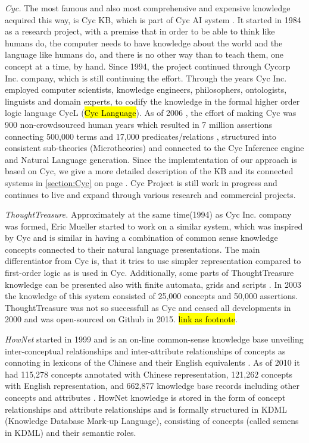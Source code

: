 \emph{Cyc.} The most famous and also most comprehensive and expensive knowledge acquired this way, is Cyc KB, which is part of Cyc AI system \parencite{Lenat1995}. It started in 1984 as a research project, with a premise that in order to be able to think like humans do, the computer needs to have knowledge about the world and the language like humans do, and there is no other way than to teach them, one concept at a time, by hand. Since 1994, the project continued through Cycorp Inc. company, which is still continuing the effort. Through the years Cyc Inc. employed computer scientists, knowledge engineers, philosophers, ontologists, linguists and domain experts, to codify the knowledge in the formal higher order logic language CycL (\hl{Cyc Language}). As of 2006   \parencite{Matuszek2006}, the effort of making Cyc was 900 non-crowdsourced human years which resulted in 7 million assertions connecting 500,000 terms and 17,000 predicates/relations \parencite{Zang2013}, structured into consistent sub-theories (Microtheories) and connected to the Cyc Inference engine and Natural Language generation. Since the implemtentation of our approach is based on Cyc, we give a more detailed description of the KB and its connected systems in \autoref{section:Cyc} on page \pageref{section:Cyc}. Cyc Project is still work in progress and continues to live and expand through various research and commercial projects.

\emph{ThoughtTreasure.} Approximately at the same time(1994) as Cyc Inc. company was formed, Eric Mueller started to work on a similar system, which was inspired by Cyc and is similar in having a combination of common sense knowledge concepts connected to their natural language presentations. The main differentiator from Cyc is, that it tries to use simpler representation compared to first-order logic as is used in Cyc. Additionally, some parts of ThoughtTreasure knowledge can be presented also with finite automata, grids and scripts \parencite{Mueller1999,Mueller2003}. In 2003 the knowledge of this system consisted of 25,000 concepts and 50,000 assertions. ThoughtTreasure was not so successfull as Cyc and ceased all developments in 2000 and was open-sourced on Github in 2015. \hl{link as footnote}.

\emph{HowNet} started in 1999 and is an on-line common-sense knowledge base unveiling inter-conceptual relationships and inter-attribute relationships of concepts as connoting in lexicons of the Chinese and their English equivalents . As of 2010 it had 115,278 concepts annotated with Chinese representation, 121,262 concepts with English representation, and 662,877 knowledge base records including other concepts and attributes \parencite{Dong2010}. HowNet knowledge is stored in the form of concept relationships and attribute relationships and is formally structured in KDML (Knowledge Database Mark-up Language), consisting of concepts (called semens in KDML) and their semantic roles.
 
